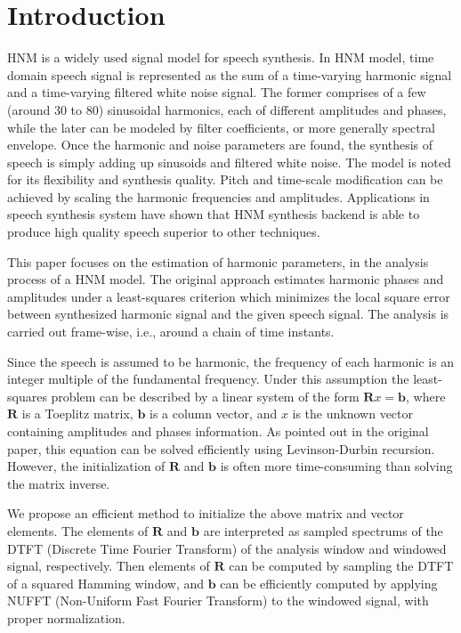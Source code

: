 \documentclass[dvips]{article}
\newcommand{\matr}[1]{\mathbf{#1}}
\begin{document}
\section{Introduction}

HNM\cite{stylianou-1996} is a widely used signal model for speech synthesis. In HNM model, time domain speech signal is represented as the sum of a time-varying harmonic signal and a time-varying filtered white noise signal. The former comprises of a few (around 30 to 80) sinusoidal harmonics, each of different amplitudes and phases, while the later can be modeled by filter coefficients, or more generally spectral envelope. Once the harmonic and noise parameters are found, the synthesis of speech is simply adding up sinusoids and filtered white noise. The model is noted for its flexibility and synthesis quality. Pitch and time-scale modification can be achieved by scaling the harmonic frequencies and amplitudes. Applications in speech synthesis system have shown that HNM synthesis backend is able to produce high quality speech superior to other techniques\cite{syrdal-1998}.

This paper focuses on the estimation of harmonic parameters, in the analysis process of a HNM model. The original approach estimates harmonic phases and amplitudes under a least-squares criterion which minimizes the local square error between synthesized harmonic signal and the given speech signal. The analysis is carried out frame-wise, i.e., around a chain of time instants.

Since the speech is assumed to be harmonic, the frequency of each harmonic is an integer multiple of the fundamental frequency. Under this assumption the least-squares problem can be described by a linear system of the form $\matr{R}x = \matr{b}$, where $\matr{R}$ is a Toeplitz matrix, $\matr{b}$ is a column vector, and $x$ is the unknown vector containing amplitudes and phases information. As pointed out in the original paper\cite{stylianou-1996}, this equation can be solved efficiently using Levinson-Durbin recursion. However, the initialization of $\matr{R}$ and $\matr{b}$ is often more time-consuming than solving the matrix inverse.

We propose an efficient method to initialize the above matrix and vector elements. The elements of $\matr{R}$ and $\matr{b}$ are interpreted as sampled spectrums of the DTFT (Discrete Time Fourier Transform) of the analysis window and windowed signal, respectively. Then elements of $\matr{R}$ can be computed by sampling the DTFT of a squared Hamming window, and $\matr{b}$ can be efficiently computed by applying NUFFT (Non-Uniform Fast Fourier Transform)\cite{greengard-2004} to the windowed signal, with proper normalization.
\end{document}
